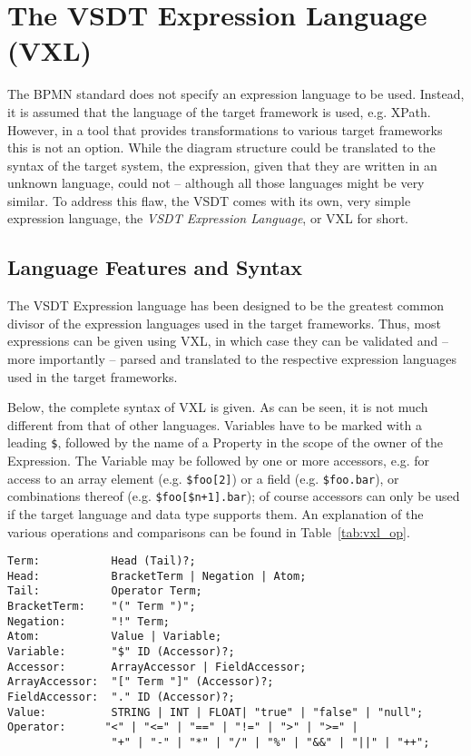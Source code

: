 
\chapter{The VSDT Expression Language (VXL)}
\label{sec:vxl}

The BPMN standard does not specify an expression language to be used. Instead, it is assumed that
the language of the target framework is used, e.g. XPath. However, in a tool that provides
transformations to various target frameworks this is not an option. While the diagram structure
could be translated to the syntax of the target system, the expression, given that they are written
in an unknown language, could not -- although all those languages might be very similar. To address
this flaw, the VSDT comes with its own, very simple expression language, the \emph{VSDT Expression
Language}, or VXL for short.


\section{Language Features and Syntax}

The VSDT Expression language has been designed to be the greatest common divisor of the expression
languages used in the target frameworks. Thus, most expressions can be given using VXL, in which
case they can be validated and -- more importantly -- parsed and translated to the respective
expression languages used in the target frameworks.

Below, the complete syntax of VXL is given. As can be seen, it is not much different from that of
other languages. Variables have to be marked with a leading \verb|$|, followed by the name of a
Property in the scope of the owner of the Expression. The Variable may be followed by one or more
accessors, e.g. for access to an array element (e.g. \verb|$foo[2]|) or a field (e.g.
\verb|$foo.bar|), or combinations thereof (e.g. \verb|$foo[$n+1].bar|); of course accessors can only
be used if the target language and data type supports them. An explanation of the various operations
and comparisons can be found in Table~\ref{tab:vxl_op}.

\begin{verbatim}
Term:           Head (Tail)?;
Head:           BracketTerm | Negation | Atom;
Tail:           Operator Term;
BracketTerm:    "(" Term ")";
Negation:       "!" Term;
Atom:           Value | Variable;
Variable:       "$" ID (Accessor)?;
Accessor:       ArrayAccessor | FieldAccessor;
ArrayAccessor:  "[" Term "]" (Accessor)?;
FieldAccessor:  "." ID (Accessor)?;
Value:          STRING | INT | FLOAT| "true" | "false" | "null";
Operator:      "<" | "<=" | "==" | "!=" | ">" | ">=" | 
                "+" | "-" | "*" | "/" | "%" | "&&" | "||" | "++";
\end{verbatim}


